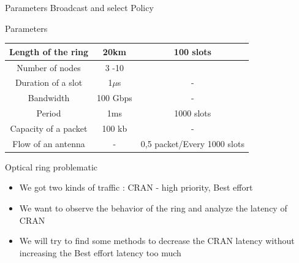 \documentclass[10 pt]{beamer}
\begin{document}
\begin{frame}{Parameters}
 \centering Broadcast and select Policy 
 
 
 \begin{block}{Parameters}
\centering
  \begin{tabular}{|c|c|c|}
  \hline
  Length of the ring & 20km & 100 slots\\
   \hline
  Number of nodes & 3 -10 & \\
  \hline
  Duration of a slot & 1$\mu$s & -\\
  \hline
  Bandwidth & 100 Gbps & -\\
  \hline
    Period & 1ms & 1000 slots\\
  \hline
    Capacity of a packet & 100 kb & -\\
  \hline
      Flow of an antenna & - & 0,5 packet/Every 1000 slots\\
  \hline
  \end{tabular}

 \end{block}

\end{frame}

\begin{frame}{Optical ring problematic}
\begin{itemize}
\item We got two kinds of traffic : CRAN - high priority, Best effort
\vspace{1cm}
\item We want to observe the behavior of the ring and analyze the latency of CRAN
\vspace{1cm}
\item We will try to find some methods to decrease the CRAN latency without increasing the Best effort latency too much
\end{itemize}
\end{frame}
\end{document}
